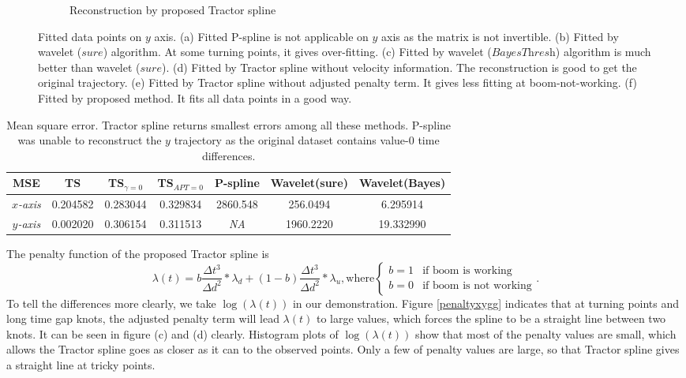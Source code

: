 \begin{figure}
\begin{subfigure}{0.45\textwidth}
    \caption{Reconstruction by proposed Tractor spline}
    \end{subfigure}
\caption{Fitted data points on $y$ axis. (a) Fitted P-spline is not applicable on $y$ axis as the matrix is not invertible. (b) Fitted by wavelet ($\textit{sure}$) algorithm. At some turning points, it gives over-fitting. (c) Fitted by wavelet ($\textit{BayesThresh}$) algorithm is much better than wavelet ($\textit{sure}$). (d) Fitted by Tractor spline without velocity information. The reconstruction is good to get the original trajectory. (e) Fitted by Tractor spline without adjusted penalty term. It gives less fitting at boom-not-working. (f) Fitted by proposed method. It fits all data points in a good way.}\label{1dy}
 \end{figure}



\begin{table}
\caption{Mean square error. Tractor spline returns smallest errors among all these methods. P-spline was unable to reconstruct the $y$ trajectory as the original dataset contains value-$0$ time differences.} \label{1dxymse}
	\setlength\tabcolsep{1.5pt}
\begin{center}
 	\begin{tabular}{|c|c|c|c|c|c|c|}
 		\hline
 		MSE   &  TS & TS$_{\gamma=0}$ & TS$_{APT=0}$   & P-spline & Wavelet(sure) & Wavelet(Bayes)\\ \hline
	\textit{$x$-\mbox{axis}}    &  0.204582 & 0.283044 & 0.329834     & 2860.548   & 256.0494  & 6.295914  \\ \hline
	\textit{$y$-\mbox{axis}}    &  0.002020 & 0.306154 & 0.311513     & \textit{NA} & 1960.2220 & 19.332990  \\ \hline
 	\end{tabular}
 \end{center}
\end{table}

The penalty function of the proposed Tractor spline is
\begin{equation}\label{penaltylamb}
\lambda(t)=b\frac{\Delta t^3}{\Delta d^2}*\lambda_d+(1-b)\frac{\Delta t^3}{\Delta d^2}*\lambda_u, \mbox{where}
\begin{cases}
b=1 & \mbox{if boom is working}\\
b=0 & \mbox{if boom is not working}
\end{cases}.
\end{equation}
To tell the differences more clearly, we take $\log(\lambda(t))$ in our demonstration. Figure \ref{penaltyxygg} indicates that at turning points and long time gap knots, the adjusted penalty term will lead $\lambda(t)$ to large values, which forces the spline to be a straight line between two knots. It can be seen in figure (c) and (d) clearly. Histogram plots of $\log(\lambda(t))$ show that most of the penalty values are small, which allows the Tractor spline goes as closer as it can to the observed points. Only a few of penalty values are large, so that Tractor spline gives a straight line at tricky points. 

